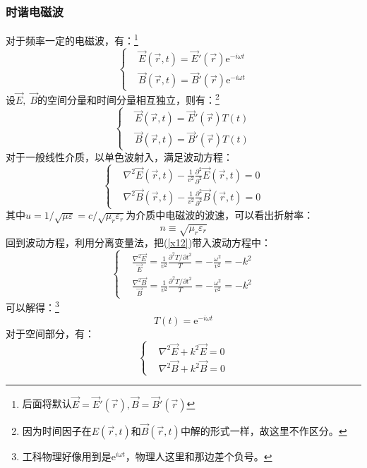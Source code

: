 \documentclass[12pt]{article}
\begin{document}
\subsubsection{时谐电磁波}
对于频率一定的电磁波，有：\footnote{后面将默认$\Vec{E}=\Vec{E}'(\Vec{r}),\Vec{B}=\Vec{B}'(\Vec{r})$}
\begin{equation}
    \left\{\begin{split}
        &\Vec{E}(\Vec{r},t)=\Vec{E}'(\Vec{r})\mathrm{e}^{-i\omega t}\\
        &\Vec{B}(\Vec{r},t)=\Vec{B}'(\Vec{r})\mathrm{e}^{-i\omega t}
    \end{split}\right.
\end{equation}
设$\Vec{E},\;\Vec{B}$的空间分量和时间分量相互独立，则有：\footnote{因为时间因子在$E(\Vec{r},t)$和$\Vec{B}(\Vec{r},t)$中解的形式一样，故这里不作区分。}
\begin{equation}
    \left\{\begin{split}
        &\Vec{E}(\Vec{r},t)=\Vec{E}'(\Vec{r})T(t)\\
        &\Vec{B}(\Vec{r},t)=\Vec{B}'(\Vec{r})T(t)
    \end{split}\right.
    \label{x12}
\end{equation}
对于一般线性介质，以单色波射入，满足波动方程：
\begin{equation}
    \left\{
    \begin{split}
        &\nabla^2\Vec{E}(\Vec{r},t)-\frac{1}{v^2}\frac{\partial^2}{\partial^2}\Vec{E}(\Vec{r},t)=0\\
        &\nabla^2\Vec{B}(\Vec{r},t)-\frac{1}{v^2}\frac{\partial^2}{\partial^2}\Vec{B}(\Vec{r},t)=0
    \end{split}\right.
\end{equation}
其中$u=1/\sqrt{\mu\varepsilon}=c/\sqrt{\mu_r\varepsilon_r}$为介质中电磁波的波速，可以看出折射率：
\begin{equation}
    n\equiv \sqrt{\mu_r\varepsilon_r}
\end{equation}
回到波动方程，利用分离变量法，把(\ref{x12})带入波动方程中：
\begin{equation}
    \left\{\begin{split}
       & \frac{\nabla^2 \Vec{E}}{\Vec{E}}=\frac{1}{v^2}\frac{\partial^2 T/\partial t^2}{T}=-\frac{\omega^2}{v^2}=-k^2\\
       & \frac{\nabla^2 \Vec{B}}{\Vec{B}}=\frac{1}{v^2}\frac{\partial^2 T/\partial t^2}{T}=-\frac{\omega^2}{v^2}=-k^2
    \end{split}\right.
\end{equation}
可以解得：\footnote{工科物理好像用到是$\mathrm{e}^{i\omega t}$，物理人这里和那边差个负号。}
\begin{equation}
    T(t)=\mathrm{e}^{-i\omega t}
\end{equation}
对于空间部分，有：
\begin{equation}\left\{
    \begin{split}
        &\nabla^2\Vec{E}+k^2\Vec{E}=0\\
        &\nabla^2\Vec{B}+k^2\Vec{B}=0
    \end{split}\right.
    \label{x13}
\end{equation}
\end{document}
